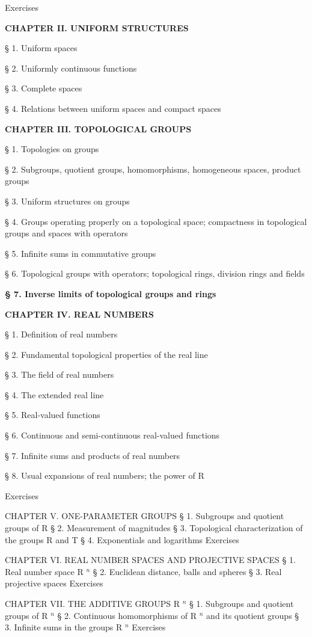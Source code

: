 Exercises

\textbf{CHAPTER II. UNIFORM STRUCTURES}

§ 1. Uniform spaces

§ 2. Uniformly continuous functions

§ 3. Complete spaces

§ 4. Relations between uniform spaces and compact spaces

\textbf{CHAPTER III. TOPOLOGICAL GROUPS}

§ 1. Topologies on groups

§ 2. Subgroups, quotient groups, homomorphisms, homogeneous spaces, product groups

§ 3. Uniform structures on groups

§ 4. Groups operating properly on a topological space; compactness in topological groups and spaces with operators

§ 5. Infinite sums in commutative groups

§ 6. Topological groups with operators; topological rings, division rings and fields

\textbf{§ 7. Inverse limits of topological groups and rings}

\textbf{CHAPTER IV. REAL NUMBERS}

§ 1. Definition of real numbers

§ 2. Fundamental topological properties of the real line

§ 3. The field of real numbers

§ 4. The extended real line

§ 5. Real-valued functions

§ 6. Continuous and semi-continuous real-valued functions

§ 7. Infinite sums and products of real numbers

§ 8. Usual expansions of real numbers; the power of R

Exercises

CHAPTER V. ONE-PARAMETER GROUPS § 1. Subgroups and quotient groups of R § 2. Measurement of magnitudes § 3. Topological characterization of the groups R and T § 4. Exponentials and logarithms Exercises

CHAPTER VI. REAL NUMBER SPACES AND PROJECTIVE SPACES § 1. Real number space R \(^{n}\) § 2. Euclidean distance, balls and spheres § 3. Real projective spaces Exercises

CHAPTER VII. THE ADDITIVE GROUPS R \(^{n}\) § 1. Subgroups and quotient groups of R \(^{n}\) § 2. Continuous homomorphisms of R \(^{n}\) and its quotient groups § 3. Infinite sums in the groups R \(^{n}\) Exercises

